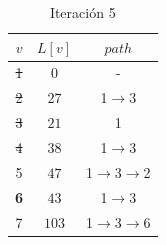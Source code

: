 \documentclass[letterpaper,10pt]{article}
\begin{document}
\begin{enumerate}
        \begin{minipage}[t]{0.3\textwidth}
            \begin{table}[H]
                \centering
            \begin{tabular}{|c|c|c|}\hline
                $ v  $ & $L[v]$ & $path$  \\ \hline
                 \sout{ 1 } & $0$ & -      \\\hline
                 \sout{ 2 } & $27$ & 1$\rightarrow$3   \\\hline
                 \sout{ 3 } & $21$ & 1   \\\hline
                 \sout{ 4 } & $38$ & 1$\rightarrow$3   \\\hline
                 5 & $47$ & 1$\rightarrow$3$\rightarrow$2   \\\hline
                 \textbf{6} & $43$ & 1$\rightarrow$3   \\\hline
                 7 & $103$ & 1$\rightarrow$3$\rightarrow$6   \\\hline
                \end{tabular}
                \caption{Iteración 5}
                \label{tablitaiteracion5}
            \end{table}
        \end{minipage}


\end{enumerate}
\end{document}
